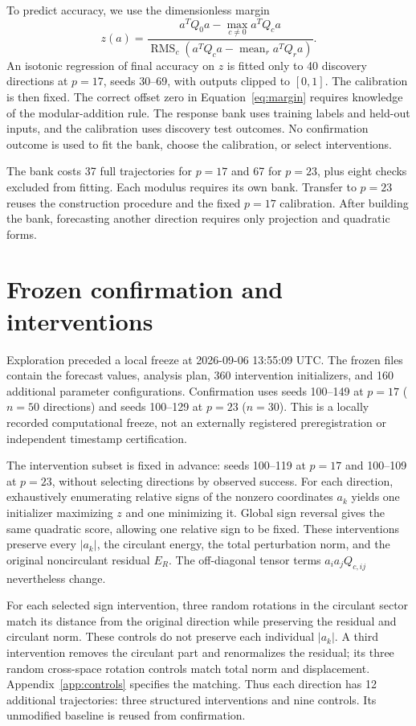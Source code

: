 \documentclass[11pt]{article}
\DeclareMathOperator{\RMS}{RMS}
\begin{document}
To predict accuracy, we use the dimensionless margin
\begin{equation}
 z(a)=\frac{a^TQ_0a-\max_{c\ne0}a^TQ_ca}{\RMS_c(a^TQ_ca-\operatorname{mean}_r a^TQ_ra)}.\label{eq:margin}
\end{equation}
An isotonic regression of final accuracy on $z$ is fitted only to 40 discovery directions at $p=17$, seeds 30--69, with outputs clipped to $[0,1]$. The calibration is then fixed. The correct offset zero in Equation~\eqref{eq:margin} requires knowledge of the modular-addition rule. The response bank uses training labels and held-out inputs, and the calibration uses discovery test outcomes. No confirmation outcome is used to fit the bank, choose the calibration, or select interventions.

The bank costs 37 full trajectories for $p=17$ and 67 for $p=23$, plus eight checks excluded from fitting. Each modulus requires its own bank. Transfer to $p=23$ reuses the construction procedure and the fixed $p=17$ calibration. After building the bank, forecasting another direction requires only projection and quadratic forms.

\section{Frozen confirmation and interventions}\label{sec:design}
Exploration preceded a local freeze at 2026-09-06 13:55:09 UTC. The frozen files contain the forecast values, analysis plan, 360 intervention initializers, and 160 additional parameter configurations. Confirmation uses seeds 100--149 at $p=17$ ($n=50$ directions) and seeds 100--129 at $p=23$ ($n=30$). This is a locally recorded computational freeze, not an externally registered preregistration or independent timestamp certification.

The intervention subset is fixed in advance: seeds 100--119 at $p=17$ and 100--109 at $p=23$, without selecting directions by observed success. For each direction, exhaustively enumerating relative signs of the nonzero coordinates $a_k$ yields one initializer maximizing $z$ and one minimizing it. Global sign reversal gives the same quadratic score, allowing one relative sign to be fixed. These interventions preserve every $|a_k|$, the circulant energy, the total perturbation norm, and the original noncirculant residual $E_R$. The off-diagonal tensor terms $a_i a_jQ_{c,ij}$ nevertheless change.

For each selected sign intervention, three random rotations in the circulant sector match its distance from the original direction while preserving the residual and circulant norm. These controls do not preserve each individual $|a_k|$. A third intervention removes the circulant part and renormalizes the residual; its three random cross-space rotation controls match total norm and displacement. Appendix~\ref{app:controls} specifies the matching. Thus each direction has 12 additional trajectories: three structured interventions and nine controls. Its unmodified baseline is reused from confirmation.
\end{document}
